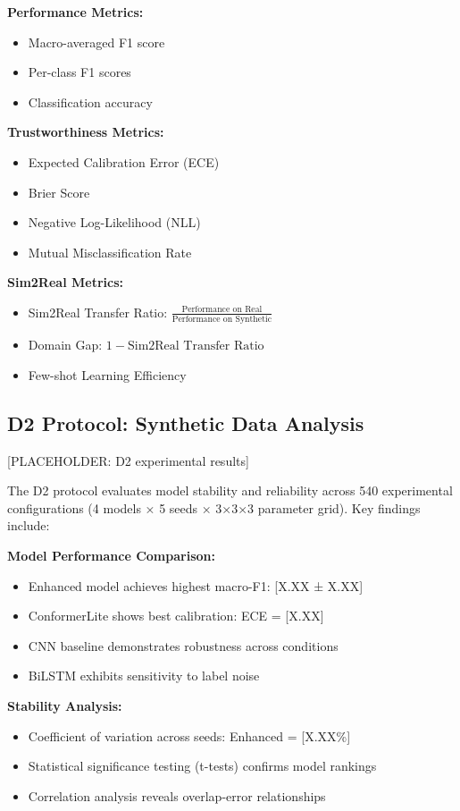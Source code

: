 \documentclass[journal]{IEEEtran}
\begin{document}
\textbf{Performance Metrics:}
\begin{itemize}
\item Macro-averaged F1 score
\item Per-class F1 scores
\item Classification accuracy
\end{itemize}

\textbf{Trustworthiness Metrics:}
\begin{itemize}
\item Expected Calibration Error (ECE)
\item Brier Score
\item Negative Log-Likelihood (NLL)
\item Mutual Misclassification Rate
\end{itemize}

\textbf{Sim2Real Metrics:}
\begin{itemize}
\item Sim2Real Transfer Ratio: $\frac{\text{Performance on Real}}{\text{Performance on Synthetic}}$
\item Domain Gap: $1 - \text{Sim2Real Transfer Ratio}$
\item Few-shot Learning Efficiency
\end{itemize}

\subsection{D2 Protocol: Synthetic Data Analysis}

[PLACEHOLDER: D2 experimental results]

The D2 protocol evaluates model stability and reliability across 540 experimental configurations (4 models × 5 seeds × 3×3×3 parameter grid). Key findings include:

\textbf{Model Performance Comparison:}
\begin{itemize}
\item Enhanced model achieves highest macro-F1: [X.XX ± X.XX]
\item ConformerLite shows best calibration: ECE = [X.XX]
\item CNN baseline demonstrates robustness across conditions
\item BiLSTM exhibits sensitivity to label noise
\end{itemize}

\textbf{Stability Analysis:}
\begin{itemize}
\item Coefficient of variation across seeds: Enhanced = [X.XX\%]
\item Statistical significance testing (t-tests) confirms model rankings
\item Correlation analysis reveals overlap-error relationships
\end{itemize}
\end{document}
